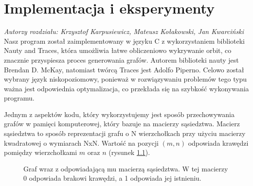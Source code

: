 \chapter{Implementacja i eksperymenty}
\textit{Autorzy rozdziału: Krzysztof Karpusiewicz, Mateusz Kołakowski, Jan Kwarciński}
\vspace{0.5cm}\newline
Nasz program został zaimplementowany w języku C z wykorzystaniem biblioteki Nauty and Traces\cite{nauty}, która umożliwia łatwe obliczeniowo wykrywanie orbit, co znacznie przyspiesza proces generowania grafów. Autorem biblioteki nauty jest Brendan D. McKay, natomiast twórcą Traces jest Adolfo Piperno. Celowo został wybrany język niskopoziomowy, ponieważ w rozwiązywaniu problemów tego typu ważna jest odpowiednia optymalizacja, co przekłada się na szybkość wykonywania programu.


Jednym z aspektów kodu, który wykorzystujemy jest sposób przechowywania grafów w pamięci komputerowej, który bazuje na macierzy sąsiedztwa. Macierz sąsiedztwa to sposób reprezentacji grafu o N wierzchołkach przy użyciu macierzy kwadratowej o wymiarach NxN. Wartość na pozycji $(m, n)$ odpowiada  krawędzi pomiędzy wierzchołkami $m$ oraz $n$ (rysunek \ref{exmatrix}).
\begin{figure}[H]
  \centering
  \hfill
  \hfill
  \hfill
  \hfill
  \caption{Graf wraz z odpowiadającą mu macierzą sąsiedztwa. W tej macierzy 0 odpowiada brakowi krawędzi, a 1 odpowiada jej istnieniu.}
  \label{exmatrix}
\end{figure}

